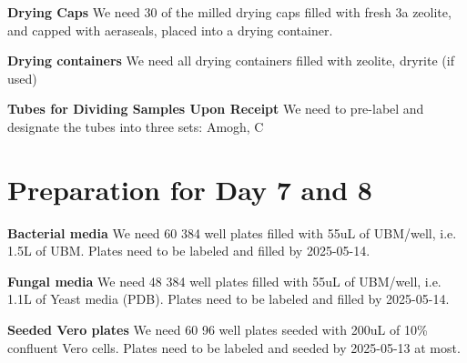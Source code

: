 \documentclass{article}
\begin{document}
\textbf{Drying Caps} We need 30 of the milled drying caps filled with fresh 3a zeolite, and capped with aeraseals, placed into a drying container. 

\textbf{Drying containers} We need all drying containers filled with zeolite, dryrite (if used) 

\textbf{Tubes for Dividing Samples Upon Receipt} We need to pre-label and designate the tubes into three sets: Amogh, C

\section{Preparation for Day 7 and 8}\label{sec:day7-prep}
\textbf{Bacterial media} We need 60 384 well plates filled with 55uL of UBM/well, i.e. 1.5L of UBM. Plates need to be labeled and filled by 2025-05-14.

\textbf{Fungal media} We need 48 384 well plates filled with 55uL of UBM/well, i.e. 1.1L of Yeast media (PDB). Plates need to be labeled and filled by 2025-05-14.

\textbf{Seeded Vero plates} We need 60 96 well plates seeded with 200uL of 10\% confluent Vero cells. Plates need to be labeled and seeded by 2025-05-13 at most. 
\end{document}
